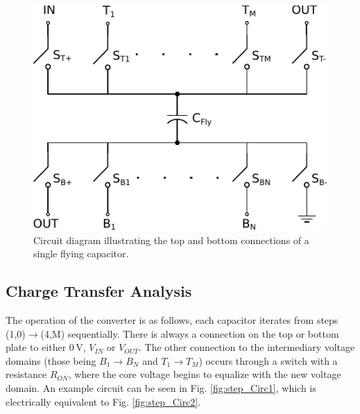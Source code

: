 \documentclass[conference]{IEEEtran}
\begin{document}
	\begin{figure}
		\centering
		\includegraphics[width=0.6\linewidth]{Figures/contRatioCore.pdf}
		\caption{Circuit diagram illustrating the top and bottom connections of a single flying capacitor.}
		\label{fig:coreCon}
	\end{figure}
	\subsection{Charge Transfer Analysis}
	The operation of the converter is as follows, each capacitor iterates from steps (1,0)$\rightarrow$(4,M) sequentially. There is always a connection on the top or bottom plate to either 0$\,$V, $V_{IN}$ or $V_{OUT}$. The other connection to the intermediary voltage domains (those being $B_1 \rightarrow B_N$ and $T_1 \rightarrow T_M$) occurs through a switch with a resistance $R_{ON}$, where the core voltage begins to equalize with the new voltage domain. An example circuit can be seen in Fig. \ref{fig:step_Circ1}, which is electrically equivalent to Fig. \ref{fig:step_Circ2}. 
	
\end{document}

